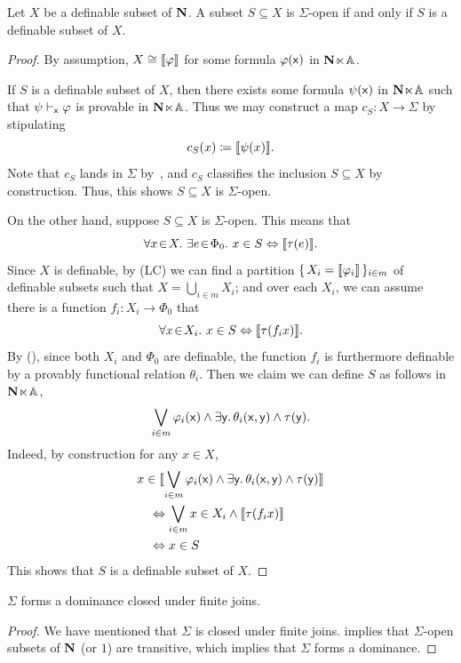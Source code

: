 \begin{proposition}\label{belongsigmadefnable}
  Let $X$ be a definable subset of $\mathbf N$. A subset $S \subseteq X$ is $\Sigma$-open if and only if $S$ is a definable subset of $X$.
\end{proposition}
\begin{proof}
  By assumption, $X \cong \llbracket\varphi\rrbracket$ for some formula $\varphi(\mathsf{x})$ in $\mathbf N\hspace{-.4ex}\ltimes\hspace{-.4ex}\mathbb{A}$. 
  
  If $S$ is a definable subset of $X$, then there exists some formula $\psi(\mathsf{x})$ in $\mathbf N\hspace{-.4ex}\ltimes\hspace{-.4ex}\mathbb{A}$ such that $\psi \vdash_{\mathsf{x}}\varphi$ is provable in $\mathbf N\hspace{-.4ex}\ltimes\hspace{-.4ex}\mathbb{A}$. Thus we may construct a map $c_S \colon X \to \Sigma$ by stipulating 
  \[ c_S(x) \coloneq \llbracket\psi(x)\rrbracket. \]
  Note that $c_S$ lands in $\Sigma$ by~, and $c_S$ classifies the inclusion $S \subseteq X$ by construction. Thus, this shows $S \subseteq X$ is $\Sigma$-open.
  
  On the other hand, suppose $S \subseteq X$ is $\Sigma$-open. This means that 
  \[ \forall x\!\in\!X.\  \exists e\!\in\!\Phi_0.\  x\in S \Leftrightarrow \llbracket\tau(e)\rrbracket. \]
  Since $X$ is definable, by (LC) we can find a partition $\{\,X_i = \llbracket\varphi_i\rrbracket\,\}_{i\in m}$ of definable subsets such that $X = \bigcup_{i\in m}X_i$; and over each $X_i$, we can assume there is a function $f_i \colon X_i \to \Phi_0$ that 
  \[ \forall x\!\in\!X_i.\  x\in S \Leftrightarrow \llbracket\tau(f_ix)\rrbracket. \]
  By (\AxiomSQCA), since both $X_i$ and $\Phi_0$ are definable, the function $f_i$ is furthermore definable by a provably functional relation $\theta_i$. Then we claim we can define $S$ as follows in $\mathbf N\hspace{-.4ex}\ltimes\hspace{-.4ex}\mathbb{A}$,
  \[ \bigvee_{i\in m} \varphi_i(\mathsf{x}) \wedge \exists \mathsf{y}.\,\theta_i(\mathsf{x},\mathsf{y}) \wedge \tau(\mathsf{y}). \]
  Indeed, by construction for any $x\in X$,
  \begin{align*}
    &x \in \llbracket\bigvee_{i\in m} \varphi_i(\mathsf{x}) \wedge \exists \mathsf{y}.\,\theta_i(\mathsf{x},\mathsf{y}) \wedge \tau(\mathsf{y})\rrbracket \\
    &\quad\Leftrightarrow \bigvee_{i\in m} x\in X_i \wedge \llbracket\tau(f_ix)\rrbracket \\
    &\quad\Leftrightarrow x \in S
  \end{align*}
  This shows that $S$ is a definable subset of $X$.
\end{proof}

\begin{corollary}\label{cor:defdominance}
  $\Sigma$ forms a dominance closed under finite joins.
\end{corollary}
\begin{proof}
  We have mentioned that $\Sigma$ is closed under finite joins.  implies that $\Sigma$-open subsets of $\mathbf N$ (or $1$) are transitive, which implies that $\Sigma$ forms a dominance.
\end{proof}

